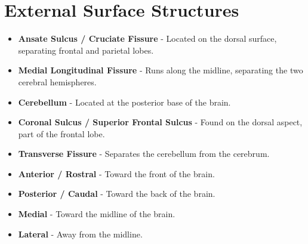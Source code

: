 \section{External Surface Structures}
\begin{itemize}
    \item \textbf{Ansate Sulcus / Cruciate Fissure} - Located on the dorsal surface, separating frontal and parietal lobes.
    \item \textbf{Medial Longitudinal Fissure} - Runs along the midline, separating the two cerebral hemispheres.
    \item \textbf{Cerebellum} - Located at the posterior base of the brain.
    \item \textbf{Coronal Sulcus / Superior Frontal Sulcus} - Found on the dorsal aspect, part of the frontal lobe.
    \item \textbf{Transverse Fissure} - Separates the cerebellum from the cerebrum.
    \item \textbf{Anterior / Rostral} - Toward the front of the brain.
    \item \textbf{Posterior / Caudal} - Toward the back of the brain.
    \item \textbf{Medial} - Toward the midline of the brain.
    \item \textbf{Lateral} - Away from the midline.
\end{itemize}

